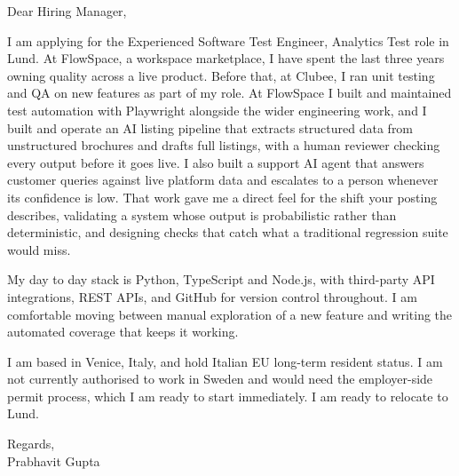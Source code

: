 \documentclass[a4paper,11pt]{article}
\begin{document}
Dear Hiring Manager,

I am applying for the Experienced Software Test Engineer, Analytics Test role in Lund. At FlowSpace, a workspace marketplace, I have spent the last three years owning quality across a live product. Before that, at Clubee, I ran unit testing and QA on new features as part of my role. At FlowSpace I built and maintained test automation with Playwright alongside the wider engineering work, and I built and operate an AI listing pipeline that extracts structured data from unstructured brochures and drafts full listings, with a human reviewer checking every output before it goes live. I also built a support AI agent that answers customer queries against live platform data and escalates to a person whenever its confidence is low. That work gave me a direct feel for the shift your posting describes, validating a system whose output is probabilistic rather than deterministic, and designing checks that catch what a traditional regression suite would miss.

My day to day stack is Python, TypeScript and Node.js, with third-party API integrations, REST APIs, and GitHub for version control throughout.  I am comfortable moving between manual exploration of a new feature and writing the automated coverage that keeps it working.

I am based in Venice, Italy, and hold Italian EU long-term resident status. I am not currently authorised to work in Sweden and would need the employer-side permit process, which I am ready to start immediately. I am ready to relocate to Lund.

Regards,\\
Prabhavit Gupta
\end{document}
